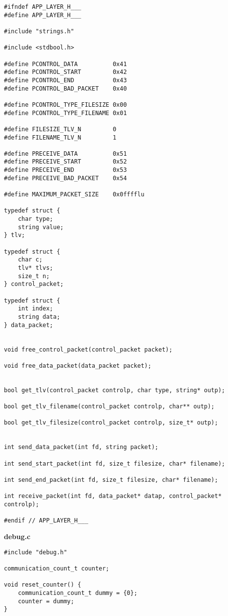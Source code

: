 \documentclass[subfiles]{main.tex}
\begin{document}
\begin{lstlisting}[style=rcom]
#ifndef APP_LAYER_H___
#define APP_LAYER_H___

#include "strings.h"

#include <stdbool.h>

#define PCONTROL_DATA          0x41
#define PCONTROL_START         0x42
#define PCONTROL_END           0x43
#define PCONTROL_BAD_PACKET    0x40

#define PCONTROL_TYPE_FILESIZE 0x00
#define PCONTROL_TYPE_FILENAME 0x01

#define FILESIZE_TLV_N         0
#define FILENAME_TLV_N         1

#define PRECEIVE_DATA          0x51
#define PRECEIVE_START         0x52
#define PRECEIVE_END           0x53
#define PRECEIVE_BAD_PACKET    0x54

#define MAXIMUM_PACKET_SIZE    0x0fffflu

typedef struct {
	char type;
	string value;
} tlv;

typedef struct {
	char c;
	tlv* tlvs;
	size_t n;
} control_packet;

typedef struct {
	int index;
	string data;
} data_packet;


void free_control_packet(control_packet packet);

void free_data_packet(data_packet packet);


bool get_tlv(control_packet controlp, char type, string* outp);

bool get_tlv_filename(control_packet controlp, char** outp);

bool get_tlv_filesize(control_packet controlp, size_t* outp);


int send_data_packet(int fd, string packet);

int send_start_packet(int fd, size_t filesize, char* filename);

int send_end_packet(int fd, size_t filesize, char* filename);

int receive_packet(int fd, data_packet* datap, control_packet* controlp);

#endif // APP_LAYER_H___
\end{lstlisting}

{\Large\textbf{debug.c}}

\begin{lstlisting}[style=rcom]
#include "debug.h"

communication_count_t counter;

void reset_counter() {
	communication_count_t dummy = {0};
	counter = dummy;
}
\end{lstlisting}
\end{document}
